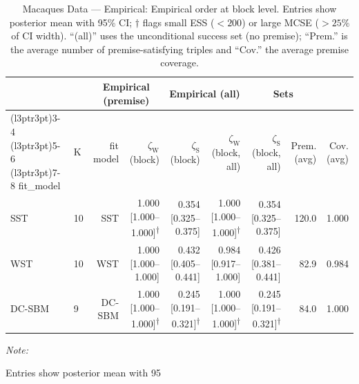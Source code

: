 \begin{table}
\centering
\caption{\label{tab:tab:macaques-data-empirical-emp-block}Macaques Data — Empirical: Empirical order at block level. Entries show posterior mean with 95\% CI; $\dagger$ flags small ESS ($<200$) or large MCSE ($>25\%$ of CI width). “(all)” uses the unconditional success set (no premise); “Prem.” is the average number of premise-satisfying triples and “Cov.” the average premise coverage.}
\centering
\begin{threeparttable}
\begin{tabular}[t]{llrrrrrrr}
\toprule
\multicolumn{2}{c}{ } & \multicolumn{2}{c}{Empirical (premise)} & \multicolumn{2}{c}{Empirical (all)} & \multicolumn{2}{c}{Sets} \\
\cmidrule(l{3pt}r{3pt}){3-4} \cmidrule(l{3pt}r{3pt}){5-6} \cmidrule(l{3pt}r{3pt}){7-8}
fit_model & K & fit model & $\zeta_{\mathrm{W}}$ (block) & $\zeta_{\mathrm{S}}$ (block) & $\zeta_{\mathrm{W}}$ (block, all) & $\zeta_{\mathrm{S}}$ (block, all) & Prem. (avg) & Cov. (avg)\\
\midrule
SST & 10 & SST & 1.000 [1.000--1.000]\textsuperscript{$\dagger$} & 0.354 [0.325--0.375] & 1.000 [1.000--1.000]\textsuperscript{$\dagger$} & 0.354 [0.325--0.375] & 120.0 & 1.000\\
WST & 10 & WST & 1.000 [1.000--1.000] & 0.432 [0.405--0.441] & 0.984 [0.917--1.000] & 0.426 [0.381--0.441] & 82.9 & 0.984\\
DC-SBM & 9 & DC-SBM & 1.000 [1.000--1.000]\textsuperscript{$\dagger$} & 0.245 [0.191--0.321]\textsuperscript{$\dagger$} & 1.000 [1.000--1.000]\textsuperscript{$\dagger$} & 0.245 [0.191--0.321]\textsuperscript{$\dagger$} & 84.0 & 1.000\\
\bottomrule
\end{tabular}
\begin{tablenotes}
\item \textit{Note: } 
\item Entries show posterior mean with 95%
\end{tablenotes}
\end{threeparttable}
\end{table}